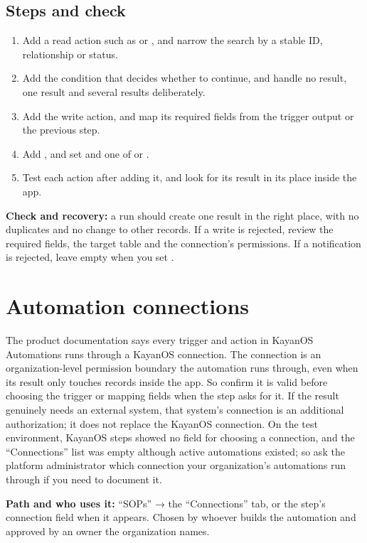 \subsection{Steps and check}
\begin{enumerate}
\item Add a read action such as  or , and narrow the search by a stable ID, relationship or status.
\item Add the condition that decides whether to continue, and handle no result, one result and several results deliberately.
\item Add the write action, and map its required fields from the trigger output or the previous step.
\item Add , and set  and one of  or .
\item Test each action after adding it, and look for its result in its place inside the app.
\end{enumerate}

\textbf{Check and recovery:} a run should create one result in the right place, with no duplicates and no change to other records. If a write is rejected, review the required fields, the target table and the connection's permissions. If a notification is rejected, leave  empty when you set .

\clearpage
\section{Automation connections}
\label{sec:builder-feature-sops-connections}

The product documentation says every trigger and action in KayanOS Automations runs through a KayanOS connection. The connection is an organization-level permission boundary the automation runs through, even when its result only touches records inside the app. So confirm it is valid before choosing the trigger or mapping fields when the step asks for it. If the result genuinely needs an external system, that system's connection is an additional authorization; it does not replace the KayanOS connection. On the  test environment, KayanOS steps showed no field for choosing a connection, and the “Connections” list was empty although active automations existed; so ask the platform administrator which connection your organization's automations run through if you need to document it.

\textbf{Path and who uses it:} “SOPs” → the “Connections” tab, or the step's connection field when it appears. Chosen by whoever builds the automation and approved by an owner the organization names.

